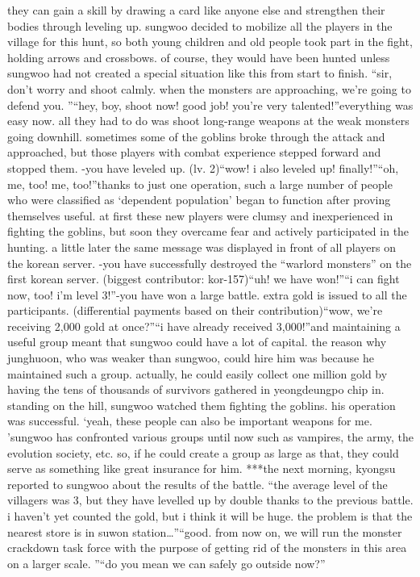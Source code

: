  they can gain a skill by drawing a card like anyone else and strengthen their bodies through leveling up.
sungwoo decided to mobilize all the players in the village for this hunt, so both young children and old people took part in the fight, holding arrows and crossbows.
of course, they would have been hunted unless sungwoo had not created a special situation like this from start to finish.
“sir, don’t worry and shoot calmly.
 when the monsters are approaching, we’re going to defend you.
”“hey, boy, shoot now! good job! you’re very talented!”everything was easy now.
 all they had to do was shoot long-range weapons at the weak monsters going downhill.
sometimes some of the goblins broke through the attack and approached, but those players with combat experience stepped forward and stopped them.
-you have leveled up.
 (lv.
 2)“wow! i also leveled up! finally!”“oh, me, too! me, too!”thanks to just one operation, such a large number of people who were classified as ‘dependent population’ began to function after proving themselves useful.
 at first these new players were clumsy and inexperienced in fighting the goblins, but soon they overcame fear and actively participated in the hunting.
a little later the same message was displayed in front of all players on the korean server.
-you have successfully destroyed the “warlord monsters” on the first korean server.
 (biggest contributor: kor-157)“uh! we have won!”“i can fight now, too! i’m level 3!”-you have won a large battle.
 extra gold is issued to all the participants.
 (differential payments based on their contribution)“wow, we’re receiving 2,000 gold at once?”“i have already received 3,000!”and maintaining a useful group meant that sungwoo could have a lot of capital.
the reason why junghuoon, who was weaker than sungwoo, could hire him was because he maintained such a group.
 actually, he could easily collect one million gold by having the tens of thousands of survivors gathered in yeongdeungpo chip in.
standing on the hill, sungwoo watched them fighting the goblins.
 his operation was successful.
‘yeah, these people can also be important weapons for me.
’sungwoo has confronted various groups until now such as vampires, the army, the evolution society, etc.
 so, if he could create a group as large as that, they could serve as something like great insurance for him.
***the next morning, kyongsu reported to sungwoo about the results of the battle.
“the average level of the villagers was 3, but they have levelled up by double thanks to the previous battle.
 i haven’t yet counted the gold, but i think it will be huge.
 the problem is that the nearest store is in suwon station…”“good.
 from now on, we will run the monster crackdown task force with the purpose of getting rid of the monsters in this area on a larger scale.
”“do you mean we can safely go outside now?”

